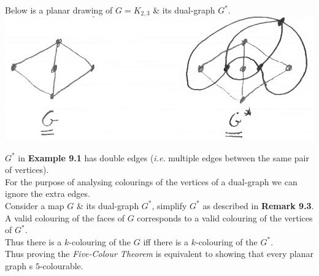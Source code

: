 \documentclass[11pt,a4paper]{article}
\begin{document}
Below is a planar drawing of $G=K_{2,3}$ \& its dual-graph $G^*$.\\
\includegraphics[scale=0.3]{img/dual.png}

$G^*$ in \textbf{Example 9.1} has double edges (\textit{i.e.} multiple edges between the same pair of vertices).\\
For the purpose of analysing colourings of the vertices of a dual-graph we can ignore the extra edges.\\

Consider a map $G$ \& its dual-graph $G^*$, simplify $G^*$ as described in \textbf{Remark 9.3}.\\
A valid colouring of the faces of $G$ corresponds to a valid colouring of the vertices of $G^*$.\\
Thus there is a $k$-colouring of the $G$ iff there is a $k$-colouring of the $G^*$.\\
\nb Thus proving the \textit{Five-Colour Theorem} is equivalent to showing that every planar graph s $5$-colourable.\\
\end{document}
